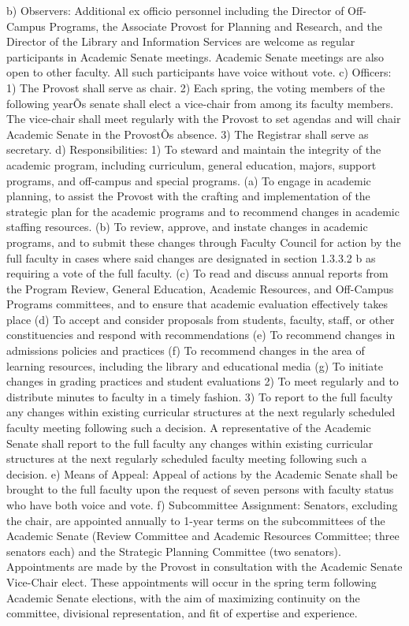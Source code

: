 \documentclass[letterpaper, 11pt]{article}
\begin{document}
b) Observers:  Additional ex officio personnel including the Director of Off-Campus Programs, the Associate Provost for Planning and Research, and the Director of the Library and Information Services are welcome as regular participants in Academic Senate meetings.  Academic Senate meetings are also open to other faculty.  All such participants have voice without vote. 
c) Officers:  
1) The Provost shall serve as chair.
2) Each spring, the voting members of the following yearÕs senate shall elect a vice-chair from among its faculty members.  The vice-chair shall meet regularly with the Provost to set agendas and will chair Academic Senate in the ProvostÕs absence.
3) The Registrar shall serve as secretary.
d) Responsibilities:
1) To steward and maintain the integrity of the academic program, including curriculum, general education, majors, support programs, and off-campus and special programs.
(a) To engage in academic planning, to assist the Provost with the crafting and implementation of the strategic plan for the academic programs and to recommend changes in academic staffing resources.
(b) To review, approve, and instate changes in academic programs, and to submit these changes through Faculty Council for action by the full faculty in cases where said changes are designated in section 1.3.3.2 b as requiring a vote of the full faculty.
(c) To read and discuss annual reports from the Program Review, General Education, Academic Resources, and Off-Campus Programs committees, and to ensure that academic evaluation effectively takes place
(d) To accept and consider proposals from students, faculty, staff, or other constituencies and respond with recommendations
(e) To recommend changes in admissions policies and practices
(f) To recommend changes in the area of learning resources, including the library and educational media
(g) To initiate changes in grading practices and student evaluations
2) To meet regularly and to distribute minutes to faculty in a timely fashion.
3) To report to the full faculty any changes within existing curricular structures at the next regularly scheduled faculty meeting following such a decision. A representative of the Academic Senate shall report to the full faculty any changes within existing curricular structures at the next regularly scheduled faculty meeting following such a decision.
e) Means of Appeal:  Appeal of actions by the Academic Senate shall be brought to the full faculty upon the request of seven persons with faculty status who have both voice and vote.
f) Subcommittee Assignment:  Senators, excluding the chair, are appointed annually to 1-year terms on the subcommittees of the Academic Senate (Review Committee and Academic Resources Committee; three senators each) and the Strategic Planning Committee (two senators).  Appointments are made by the Provost in consultation with the Academic Senate Vice-Chair elect.  These appointments will occur in the spring term following Academic Senate elections, with the aim of maximizing continuity on the committee, divisional representation, and fit of expertise and experience.
\end{document}
